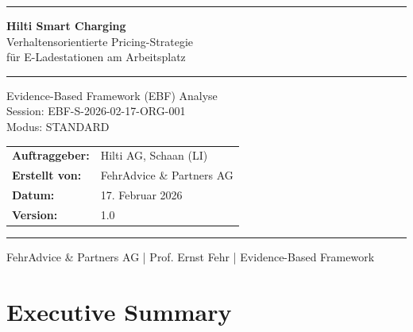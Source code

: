 \documentclass[11pt,a4paper]{article}
\begin{document}
\begin{titlepage}
\centering
\vspace*{3cm}

{\color{fadarkblue}\rule{\textwidth}{2pt}}
\vspace{1cm}

{\Huge\bfseries\color{fadarkblue} Hilti Smart Charging}\\[0.5cm]
{\LARGE\color{fadarkgray} Verhaltensorientierte Pricing-Strategie\\f\"ur E-Ladestationen am Arbeitsplatz}

\vspace{1.5cm}

{\large\color{fadarkblue}\rule{0.5\textwidth}{0.5pt}}

\vspace{1cm}

{\large\color{fadarkgray}
Evidence-Based Framework (EBF) Analyse\\[0.3cm]
Session: EBF-S-2026-02-17-ORG-001\\[0.3cm]
Modus: STANDARD
}

\vspace{2cm}

{\large
\begin{tabular}{ll}
\textbf{\color{fadarkblue}Auftraggeber:} & Hilti AG, Schaan (LI) \\[0.2cm]
\textbf{\color{fadarkblue}Erstellt von:} & FehrAdvice \& Partners AG \\[0.2cm]
\textbf{\color{fadarkblue}Datum:} & 17. Februar 2026 \\[0.2cm]
\textbf{\color{fadarkblue}Version:} & 1.0 \\
\end{tabular}
}

\vfill
{\color{fadarkblue}\rule{\textwidth}{2pt}}

{\small\color{fadarkgray} FehrAdvice \& Partners AG | Prof. Ernst Fehr | Evidence-Based Framework}
\end{titlepage}

\tableofcontents
\newpage

\section{Executive Summary}
\end{document}
